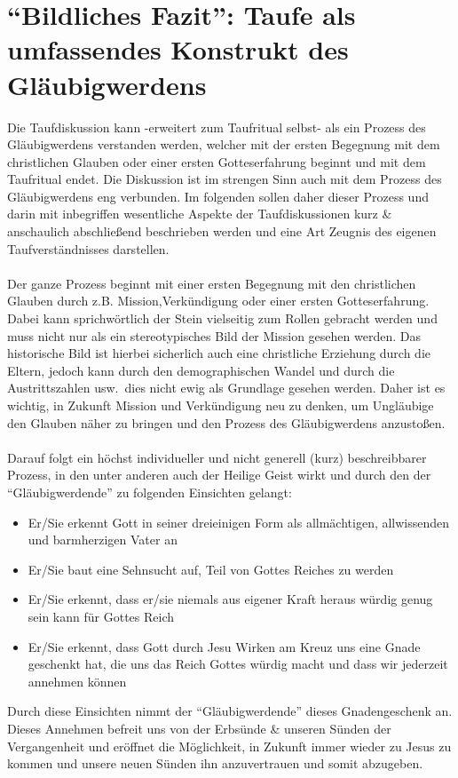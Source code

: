\section{``Bildliches Fazit'': Taufe als umfassendes Konstrukt des Gläubigwerdens}
Die Taufdiskussion kann -erweitert zum Taufritual selbst- als ein Prozess des Gläubigwerdens verstanden werden, welcher mit der ersten Begegnung mit dem christlichen Glauben oder einer ersten Gotteserfahrung beginnt und mit dem Taufritual endet. Die Diskussion ist im strengen Sinn auch mit dem Prozess des Gläubigwerdens eng verbunden. Im folgenden sollen daher dieser Prozess und darin mit inbegriffen wesentliche Aspekte der Taufdiskussionen kurz \& anschaulich abschließend beschrieben werden und eine Art Zeugnis des eigenen Taufverständnisses darstellen.
\\~\\
Der ganze Prozess beginnt mit einer ersten Begegnung mit den christlichen Glauben durch z.B. Mission,Verkündigung oder einer ersten Gotteserfahrung. Dabei kann sprichwörtlich der Stein vielseitig zum Rollen gebracht werden und muss nicht nur als ein stereotypisches Bild der Mission gesehen werden. Das historische Bild ist hierbei sicherlich auch eine christliche Erziehung durch die Eltern, jedoch kann durch den demographischen Wandel und durch die Austrittszahlen usw.\ dies nicht ewig als Grundlage gesehen werden. Daher ist es wichtig, in Zukunft Mission und Verkündigung neu zu denken, um Ungläubige den Glauben näher zu bringen und den Prozess des Gläubigwerdens anzustoßen.
\\~\\
Darauf folgt ein höchst individueller und nicht generell (kurz) beschreibbarer Prozess, in den unter anderen auch der Heilige Geist wirkt und durch den der ``Gläubigwerdende'' zu folgenden Einsichten gelangt:
\begin{itemize}
	\item Er/Sie erkennt Gott in seiner dreieinigen Form als allmächtigen, allwissenden und barmherzigen Vater an
	\item Er/Sie baut eine Sehnsucht auf, Teil von Gottes Reiches zu werden
	\item Er/Sie erkennt, dass er/sie niemals aus eigener Kraft heraus würdig genug sein kann für Gottes Reich
	\item Er/Sie erkennt, dass Gott durch Jesu Wirken am Kreuz uns eine Gnade geschenkt hat, die uns das Reich Gottes würdig macht und dass wir jederzeit annehmen können
\end{itemize}
Durch diese Einsichten nimmt der ``Gläubigwerdende'' dieses Gnadengeschenk an. Dieses Annehmen befreit uns von der Erbsünde \& unseren Sünden der Vergangenheit und eröffnet die Möglichkeit, in Zukunft immer wieder zu Jesus zu kommen und unsere neuen Sünden ihn anzuvertrauen und somit abzugeben.
